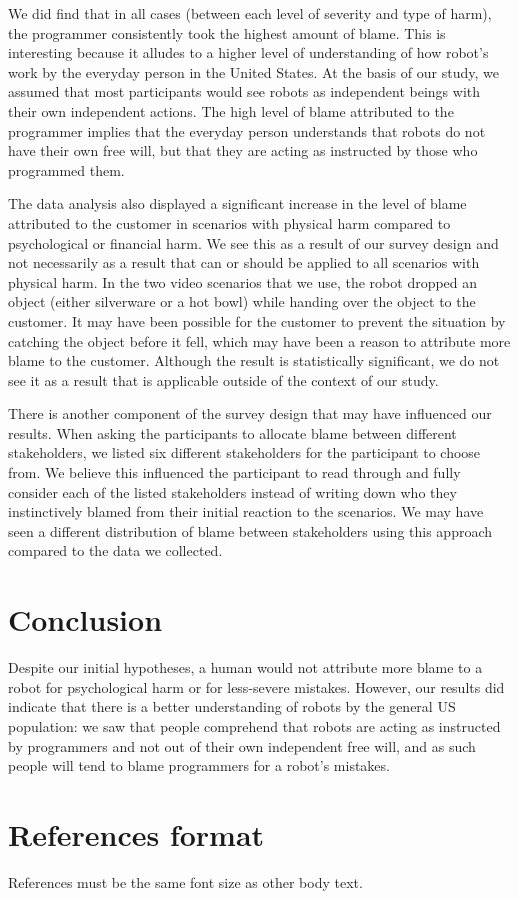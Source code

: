 \documentclass{sigchi}
\begin{document}
We did find that in all cases (between each level of severity and type of harm), the programmer consistently took the highest amount of blame. This is interesting because it alludes to a higher level of understanding of how robot's work by the everyday person in the United States. At the basis of our study, we assumed that most participants would see robots as independent beings with their own independent actions. The high level of blame attributed to the programmer implies that the everyday person understands that robots do not have their own free will, but that they are acting as instructed by those who programmed them.

The data analysis also displayed a significant increase in the level of blame attributed to the customer in scenarios with physical harm compared to psychological or financial harm. We see this as a result of our survey design and not necessarily as a result that can or should be applied to all scenarios with physical harm. In the two video scenarios that we use, the robot dropped an object (either silverware or a hot bowl) while handing over the object to the customer. It may have been possible for the customer to prevent the situation by catching the object before it fell, which may have been a reason to attribute more blame to the customer. Although the result is statistically significant, we do not see it as a result that is applicable outside of the context of our study.

There is another component of the survey design that may have influenced our results. When asking the participants to allocate blame between different stakeholders, we listed six different stakeholders for the participant to choose from. We believe this influenced the participant to read through and fully consider each of the listed stakeholders instead of writing down who they instinctively blamed from their initial reaction to the scenarios. We may have seen a different distribution of blame between stakeholders using this approach compared to the data we collected.

\section{Conclusion}
Despite our initial hypotheses, a human would not attribute more blame to a robot for psychological harm or for less-severe mistakes. However, our results did indicate that there is a better understanding of robots by the general US population: we saw that people comprehend that robots are acting as instructed by programmers and not out of their own independent free will, and as such people will tend to blame programmers for a robot's mistakes.

\section{References format}
References must be the same font size as other body text.


\end{document}
